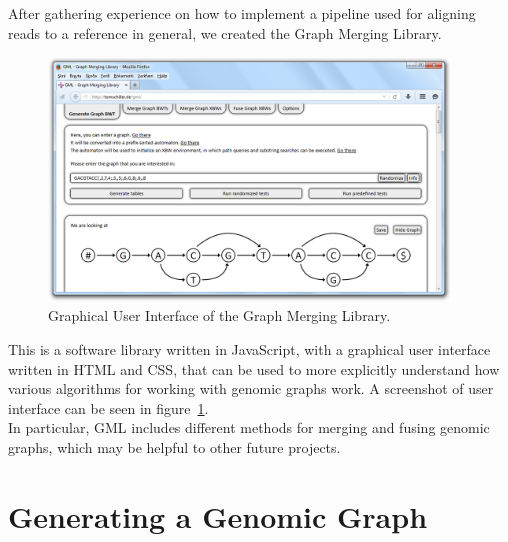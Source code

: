 \documentclass[a4paper,12pt,twoside,BCOR=10mm]{scrbook}
\begin{document}
After gathering experience on how to implement a pipeline used for aligning reads to a reference in general, 
we created the Graph Merging Library. 
\begin{figure}[!htb]
\centering
\includegraphics[width=0.95\textwidth]{evo_gml_3.png}
\caption[GUI of the Graph Merging Library]{Graphical User Interface of the Graph Merging Library.} \label{fig:evo_gml_3}
\end{figure}
This is a software library written in JavaScript, with a graphical user interface written in HTML and CSS, 
that can be used to more explicitly understand how various algorithms for working with genomic graphs work. 
A screenshot of user interface can be seen in figure~\ref{fig:evo_gml_3}. \\
In particular, GML includes different methods for merging and fusing genomic graphs, 
which may be helpful to other future projects.

\section{Generating a Genomic Graph}
%
\end{document}
